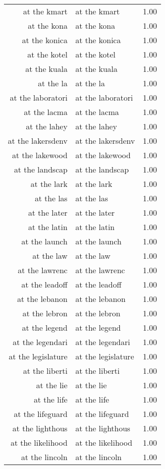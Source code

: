 \begin{table}[ht]
\begin{tabular}{rlr}
  at the kmart & at the kmart & 1.00 \\ 
  at the kona & at the kona & 1.00 \\ 
  at the konica & at the konica & 1.00 \\ 
  at the kotel & at the kotel & 1.00 \\ 
  at the kuala & at the kuala & 1.00 \\ 
  at the la & at the la & 1.00 \\ 
  at the laboratori & at the laboratori & 1.00 \\ 
  at the lacma & at the lacma & 1.00 \\ 
  at the lahey & at the lahey & 1.00 \\ 
  at the lakersdenv & at the lakersdenv & 1.00 \\ 
  at the lakewood & at the lakewood & 1.00 \\ 
  at the landscap & at the landscap & 1.00 \\ 
  at the lark & at the lark & 1.00 \\ 
  at the las & at the las & 1.00 \\ 
  at the later & at the later & 1.00 \\ 
  at the latin & at the latin & 1.00 \\ 
  at the launch & at the launch & 1.00 \\ 
  at the law & at the law & 1.00 \\ 
  at the lawrenc & at the lawrenc & 1.00 \\ 
  at the leadoff & at the leadoff & 1.00 \\ 
  at the lebanon & at the lebanon & 1.00 \\ 
  at the lebron & at the lebron & 1.00 \\ 
  at the legend & at the legend & 1.00 \\ 
  at the legendari & at the legendari & 1.00 \\ 
  at the legislature & at the legislature & 1.00 \\ 
  at the liberti & at the liberti & 1.00 \\ 
  at the lie & at the lie & 1.00 \\ 
  at the life & at the life & 1.00 \\ 
  at the lifeguard & at the lifeguard & 1.00 \\ 
  at the lighthous & at the lighthous & 1.00 \\ 
  at the likelihood & at the likelihood & 1.00 \\ 
  at the lincoln & at the lincoln & 1.00 \\ 

\end{tabular}
\end{table}

